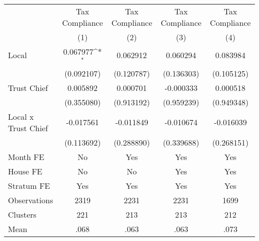 {
\def\sym#1{\ifmmode^{#1}\else\(^{#1}\)\fi}
\begin{tabular}{l*{4}{c}}
\toprule
                &\multicolumn{1}{c}{Tax Compliance}&\multicolumn{1}{c}{Tax Compliance}&\multicolumn{1}{c}{Tax Compliance}&\multicolumn{1}{c}{Tax Compliance}\\
                &\multicolumn{1}{c}{(1)}         &\multicolumn{1}{c}{(2)}         &\multicolumn{1}{c}{(3)}         &\multicolumn{1}{c}{(4)}         \\
\midrule
Local           & 0.067977\sym{*}  & 0.062912         & 0.060294         & 0.083984         \\
                &(0.092107)         &(0.120787)         &(0.136303)         &(0.105125)         \\
Trust Chief     & 0.005892         & 0.000701         &-0.000333         & 0.000518         \\
                &(0.355080)         &(0.913192)         &(0.959239)         &(0.949348)         \\
Local x Trust Chief&-0.017561         &-0.011849         &-0.010674         &-0.016039         \\
                &(0.113692)         &(0.288890)         &(0.339688)         &(0.268151)         \\
Month FE        &       No         &      Yes         &      Yes         &      Yes         \\
House FE        &       No         &       No         &      Yes         &      Yes         \\
Stratum FE      &      Yes         &      Yes         &      Yes         &      Yes         \\
\midrule
Observations    &     2319         &     2231         &     2231         &     1699         \\
Clusters        &      221         &      213         &      213         &      212         \\
Mean            &     .068         &     .063         &     .063         &     .073         \\
\bottomrule
\end{tabular}
}
